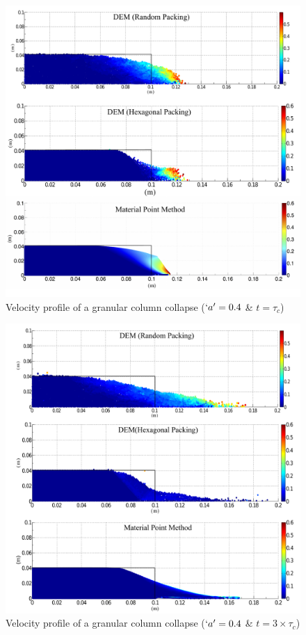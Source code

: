 \begin{figure}[tbhp]
\centering
\includegraphics[width=\textwidth]{a04tc}
\caption{Velocity profile of a granular column collapse ($`a' = 0.4$ \& 
$t=\tau_c$)}
\label{fig:a04tc}
\end{figure}



\begin{figure}[tbhp]
\centering
\includegraphics[width=\textwidth]{a04f}
\caption{Velocity profile of a granular column collapse ($`a' = 0.4$ \& 
$t=3\times\tau_c$)}
\label{fig:a04f}
\end{figure}


